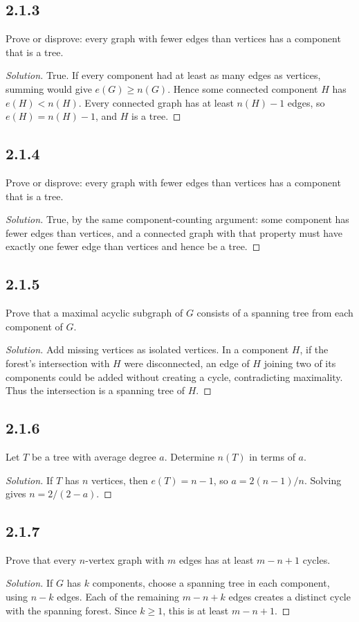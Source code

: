 \documentclass[12pt]{amsart}
\newenvironment{solution}{\begin{proof}[Solution]}{\end{proof}}
\begin{document}
    \subsection*{2.1.3} Prove or disprove: every graph with fewer edges than vertices has a component that is a tree.
    \begin{solution}True. If every component had at least as many edges as vertices, summing would give $e(G)\ge n(G)$. Hence some connected component $H$ has $e(H)<n(H)$. Every connected graph has at least $n(H)-1$ edges, so $e(H)=n(H)-1$, and $H$ is a tree.\end{solution}
    \subsection*{2.1.4} Prove or disprove: every graph with fewer edges than vertices has a component that is a tree.
    \begin{solution}True, by the same component-counting argument: some component has fewer edges than vertices, and a connected graph with that property must have exactly one fewer edge than vertices and hence be a tree.\end{solution}
    \subsection*{2.1.5} Prove that a maximal acyclic subgraph of $G$ consists of a spanning tree from each component of $G$.
    \begin{solution}Add missing vertices as isolated vertices. In a component $H$, if the forest's intersection with $H$ were disconnected, an edge of $H$ joining two of its components could be added without creating a cycle, contradicting maximality. Thus the intersection is a spanning tree of $H$.\end{solution}
    \subsection*{2.1.6} Let $T$ be a tree with average degree $a$. Determine $n(T)$ in terms of $a$.
    \begin{solution}If $T$ has $n$ vertices, then $e(T)=n-1$, so
        $a=2(n-1)/n$. Solving gives $n=2/(2-a)$.\end{solution}
    \subsection*{2.1.7} Prove that every $n$-vertex graph with $m$ edges has at least $m-n+1$ cycles.
    \begin{solution}If $G$ has $k$ components, choose a spanning tree in each component, using $n-k$ edges. Each of the remaining $m-n+k$ edges creates a distinct cycle with the spanning forest. Since $k\ge1$, this is at least $m-n+1$.\end{solution}
\end{document}
